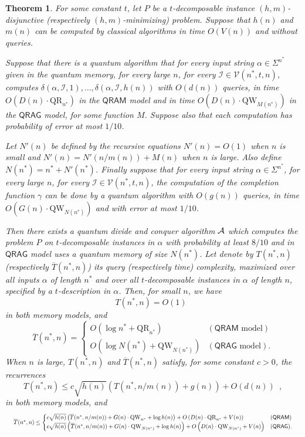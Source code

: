 \documentclass[12pt]{article}
\newcommand{\qr}{\mathrm{QR}}
\newcommand{\qw}{\mathrm{QW}}
\newtheorem{theorem}{Theorem}
\theoremstyle{definition}
\begin{document}
\begin{theorem}
\label{thm:rec}
For some constant $t$, let $P$ be a $t$-decomposable instance $(h,m)$-{disjunctive} (respectively $(h,m)$-{minimizing}) problem.
Suppose that $h(n)$ and $m(n)$ can be computed by classical algorithms in time $O(V(n))$ and without queries.

Suppose that there is a quantum algorithm that for every input string $\alpha \in \Sigma^{n^*}$ given in the quantum memory,
for every large $n$, for every $\mathcal{I} \in  \mathcal{V}(n^*,t,n)$, computes $ \delta(\alpha, \mathcal{I}, 1), \ldots,  \delta(\alpha, \mathcal{I}, h(n))$ with $O(d(n))$ queries, in time $O(D(n) \cdot \qr_{n^*})$ in the $\mathsf{QRAM}$ model and 
in time $O(D(n) \cdot \qw_{M(n^*)})$ in the $\mathsf{QRAG}$ model, for some function $M$.
Suppose also that each computation has probability of error at most $1/10$.

Let $N'(n)$ be defined by the recursive equations $N'(n) = O(1)$ when $n$ is small and $N'(n) = N'(n/m(n)) + M(n)$
when $n$ is large.
Also define $N(n^*) = n^* + N'(n^*)$. Finally suppose that for every input string $\alpha \in \Sigma^{n^*}$, for every large $n$, for every $\mathcal{I} \in  \mathcal{V}(n^*,t,n)$, the computation of the completion function $\gamma$ can be done 
by a quantum algorithm with $O(g(n))$ queries, in time $O(G(n) \cdot \qw_{N(n^*)} )$ and with error at most $1/10$.

Then there exists a quantum divide and conquer algorithm ${\cal A}$ which computes the problem $P$ on $t$-decomposable instances in $\alpha$ with probability at least $8/10$ and in $\mathsf{QRAG}$ model uses a quantum memory of size $N(n^*)$. Let denote by
$T(n^*,n)$ (respectively $\overline{T}(n^*,n)$) its query (respectively time) complexity, maximized over all inputs $\alpha$ of length $n^*$ and over all $t$-decomposable instances in $\alpha$ of length $n$, specified by a $t$-description in $\alpha$. Then, for small $n$, we have
\[
T(n^*,n) = O(1)  \enspace
\]
in both memory models, and
\[
  \overline{T}(n^*,n) =\begin{cases}
  O(\log n^* + \qr_{n^*}) &  (\mathsf{QRAM} \text{ model})\\
  O(\log N(n^*) + \qw_{N(n^*)}) &(\mathsf{QRAG} \text{ model}).
  \end{cases}
\]
When $n$ is large, $T(n^*,n)$ and $\overline{T}(n^*,n)$ satisfy, for some constant $c > 0$, the recurrences
\[
T(n^*,n) \leq c \sqrt{h(n)} \left(T(n^*,n/m(n)) + g(n) \right)  + {O}(d(n))  \enspace,
\]
in both memory models, and
\[
\resizebox{\textwidth}{!}{
$
\overline{T}(n^*, n) \le \begin{cases}
c \sqrt{h(n)} \left(\overline{T}(n^*,n/m(n))  + G(n) \cdot \qw_{n^*} + \log h(n) \right) + 
{O} \left(D(n)  \cdot \qr_{n^*} + V(n) \right) & (\mathsf{QRAM}) \\
c \sqrt{h(n)} \left(\overline{T}(n^*, n/m(n))  + G(n) \cdot \qw_{N(n^*)} + \log h(n) \right) + 
{O} \left(D(n)  \cdot \qw_{N(n^*)} + V(n) \right) & (\mathsf{QRAG}).
\end{cases}
$
}
\]
\end{theorem}
\end{document}
